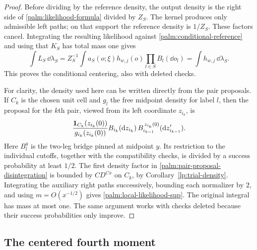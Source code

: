 \begin{proof}
Before dividing by the reference density, the output density is the
right side of \eqref{palm:likelihood-formula} divided by $Z_S$.
The kernel produces only admissible left paths; on that support the
reference density is $1/Z_S$.  These factors cancel.  Integrating the
resulting likelihood against \eqref{palm:conditional-reference} and
using that $K_S$ has total mass one gives
\[
 \int L_S\,\dd\lambda_S
   =Z_S^{-1}\int a_S(o;\xi)h_{w,j}(o)\prod_{l\in S}B_l(\dd o_l)
   =\int h_{w,j}\,\dd\lambda_S.
\]
This proves the conditional centering, also with deleted checks.

For clarity, the density used here can be written directly from the
pair proposals.  If $C_k$ is the chosen unit cell and $g_l$ the free
midpoint density for label $l$, then the proposal for the $k$th pair,
viewed from its left coordinate $z_{i_k}$, is
\begin{equation}\label{palm:pair-proposal-disintegration}
 \frac{\mathbf 1_{C_k}(z_{i_k}(0))}{g_{i_k}(z_{i_k}(0))}
       B_{i_k}(\mathrm d z_{i_k})\,
       B_{i_{k-1}}^{\,z_{i_k}(0)}(\mathrm d z'_{i_{k-1}}).
\end{equation}
Here $B_l^y$ is the two-leg bridge pinned at midpoint $y$.
Its restriction to the individual cutoffs, together with the
compatibility checks, is divided by a success probability at least
$1/2$.  The first density factor in
\eqref{palm:pair-proposal-disintegration} is bounded by $CD^{Cx}$
on $C_k$, by Corollary~\ref{lp:trial-density}.  Integrating the auxiliary
right paths successively, bounding each normalizer by $2$, and using
$m=O(x^{-1/2})$ gives \eqref{palm:local-likelihood-sup}.
The original integral has mass at most one.  The same argument works
with checks deleted because their success probabilities only improve.
\end{proof}

\subsection{The centered fourth moment}

